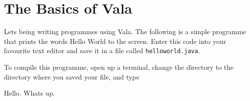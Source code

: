 \chapter{The Basics of Vala}

Lets being writing programmes using Vala. The following is a simple programme that prints the words Hello World to the screen. Enter this code into your favourite text editor and save it in a file called \texttt{helloworld.java}.


To compile this programme, open up a terminal, change the directory to the directory where you saved your file, and type

\begin{bashcommands}
Hello.
Whats up.
\end{bashcommands}


